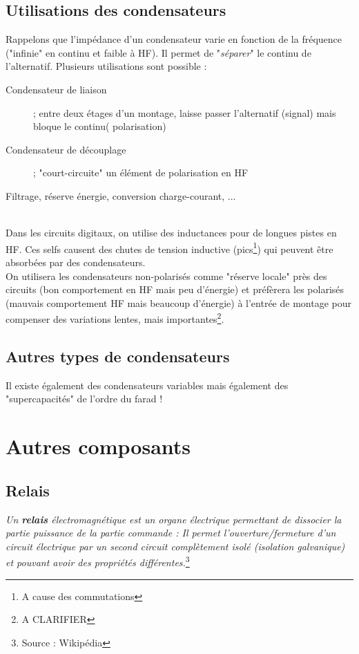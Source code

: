 \subsection{Utilisations des condensateurs}
Rappelons que l'impédance d'un condensateur varie en fonction de la fréquence ("infinie" en continu et faible à HF). Il permet de "\textit{séparer}" le continu de l'alternatif. Plusieurs utilisations sont possible :
\begin{description}
	\item[Condensateur de liaison]; entre deux étages d'un montage, laisse passer l'alternatif (signal) mais bloque le continu( polarisation)
	\item[Condensateur de découplage ]; "court-circuite" un élément de polarisation en HF
	\item[Filtrage, réserve énergie, conversion charge-courant, ...]
\end{description}\ \\
Dans les circuits digitaux, on utilise des inductances pour de longues pistes en HF. Ces selfs causent des chutes de tension inductive (pics\footnote{A cause des commutations}) qui peuvent être absorbées par des condensateurs.\\
On utilisera les condensateurs non-polarisés comme "réserve locale" près des circuits (bon comportement en HF mais peu d'énergie) et préfèrera les polarisés (mauvais comportement HF mais beaucoup d'énergie) à l'entrée de montage pour compenser des variations lentes, mais importantes\footnote{A CLARIFIER}.

\subsection{Autres types de condensateurs}
Il existe également des condensateurs variables mais également des "supercapacités" de l'ordre du farad ! 


\section{Autres composants}
\subsection{Relais}

\textit{Un \textbf{relais} électromagnétique est un organe électrique permettant de dissocier la partie puissance de la partie commande  : Il permet l'ouverture/fermeture d'un circuit électrique par un second circuit complètement isolé (isolation galvanique) et pouvant avoir des propriétés différentes.}\footnote{Source : Wikipédia}\\

